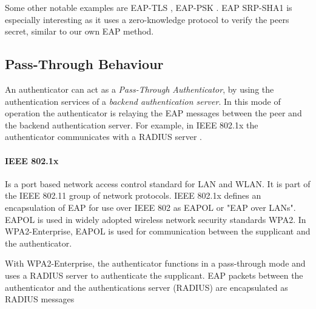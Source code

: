 Some other notable examples are EAP-TLS \cite{simon2008eap}, EAP-PSK \cite{bersani2007eap}.
EAP SRP-SHA1 \cite{carlson135eap} is especially interesting as it uses a zero-knowledge protocol to verify the peers secret, similar to our own EAP method.

\subsection{Pass-Through Behaviour}
An authenticator can act as a \textit{Pass-Through Authenticator}, by using the authentication services of a \textit{backend authentication server}.
In this mode of operation the authenticator is relaying the EAP messages between the peer and the backend authentication server.
For example, in IEEE 802.1x the authenticator communicates with a RADIUS server \cite{congdon2003ieee}.

\paragraph{IEEE 802.1x}

Is a port based network access control standard for LAN and WLAN.
It is part of the IEEE 802.11 group of network protocols.
IEEE 802.1x defines an encapsulation of EAP for use over IEEE 802 as EAPOL or "EAP over LANs".
EAPOL is used in widely adopted wireless network security standards WPA2. 
In WPA2-Enterprise, EAPOL is used for communication between the supplicant and the authenticator.

With WPA2-Enterprise, the authenticator functions in a pass-through mode and uses a RADIUS server to authenticate the supplicant.
EAP packets between the authenticator and the authentications server (RADIUS) are encapsulated as RADIUS messages \cite{aboba2003radius, chen2005extensible, congdon2003ieee}